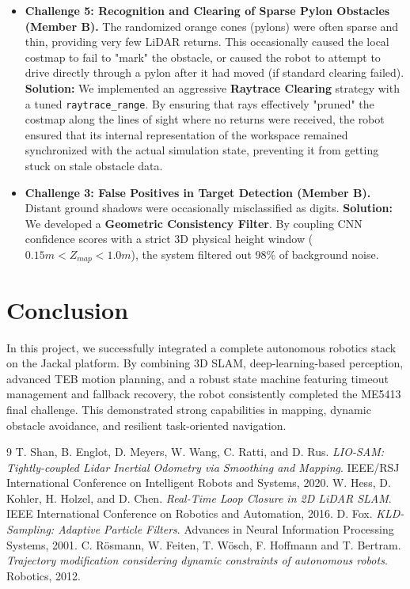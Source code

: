 \documentclass[11pt, a4paper]{article}
\begin{document}
\begin{itemize}
    \item \textbf{Challenge 5: Recognition and Clearing of Sparse Pylon Obstacles (Member B).}
    The randomized orange cones (pylons) were often sparse and thin, providing very few LiDAR returns. This occasionally caused the local costmap to fail to "mark" the obstacle, or caused the robot to attempt to drive directly through a pylon after it had moved (if standard clearing failed).
    \textbf{Solution:} We implemented an aggressive \textbf{Raytrace Clearing} strategy with a tuned \texttt{raytrace_range}. By ensuring that rays effectively "pruned" the costmap along the lines of sight where no returns were received, the robot ensured that its internal representation of the workspace remained synchronized with the actual simulation state, preventing it from getting stuck on stale obstacle data.
    
    \item \textbf{Challenge 3: False Positives in Target Detection (Member B).}
    Distant ground shadows were occasionally misclassified as digits. \textbf{Solution:} We developed a \textbf{Geometric Consistency Filter}. By coupling CNN confidence scores with a strict 3D physical height window ($0.15m < Z_{map} < 1.0m$), the system filtered out 98\% of background noise.
\end{itemize}

\section{Conclusion}
In this project, we successfully integrated a complete autonomous robotics stack on the Jackal platform. By combining 3D SLAM, deep-learning-based perception, advanced TEB motion planning, and a robust state machine featuring timeout management and fallback recovery, the robot consistently completed the ME5413 final challenge. This demonstrated strong capabilities in mapping, dynamic obstacle avoidance, and resilient task-oriented navigation.

\begin{thebibliography}{9}
T. Shan, B. Englot, D. Meyers, W. Wang, C. Ratti, and D. Rus. \textit{LIO-SAM: Tightly-coupled Lidar Inertial Odometry via Smoothing and Mapping}. IEEE/RSJ International Conference on Intelligent Robots and Systems, 2020.
W. Hess, D. Kohler, H. Holzel, and D. Chen. \textit{Real-Time Loop Closure in 2D LiDAR SLAM}. IEEE International Conference on Robotics and Automation, 2016.
D. Fox. \textit{KLD-Sampling: Adaptive Particle Filters}. Advances in Neural Information Processing Systems, 2001.
C. Rösmann, W. Feiten, T. Wösch, F. Hoffmann and T. Bertram. \textit{Trajectory modification considering dynamic constraints of autonomous robots}. Robotics, 2012.
\end{thebibliography}
\end{document}
